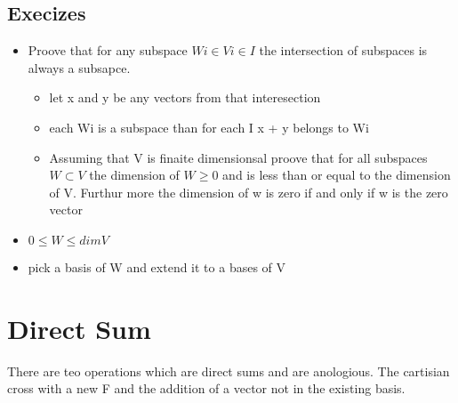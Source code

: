 \documentclass[twocolumn]{article}
\providecommand{\tightlist}{%
  \setlength{\itemsep}{0pt}\setlength{\parskip}{0pt}}
\begin{document}
\hypertarget{execizes}{%
\subsection{Execizes}\label{execizes}}

\begin{itemize}
\tightlist
\item
  Proove that for any subspace \(Wi \in V i\in I\) the intersection of
  subspaces is always a subsapce.

  \begin{itemize}
  \tightlist
  \item
    let x and y be any vectors from that interesection
  \item
    each Wi is a subspace than for each I x + y belongs to Wi
  \item
    Assuming that V is finaite dimensionsal proove that for all
    subspaces \(W \subset V\) the dimension of \(W \geq 0\) and is less
    than or equal to the dimension of V. Furthur more the dimension of w
    is zero if and only if w is the zero vector
  \end{itemize}
\item
  \(0 \leq W \leq dimV\)
\item
  pick a basis of W and extend it to a bases of V
\end{itemize}

\hypertarget{direct-sum}{%
\section{Direct Sum}\label{direct-sum}}

There are teo operations which are direct sums and are anologious. The
cartisian cross with a new F and the addition of a vector not in the
existing basis.
\end{document}
